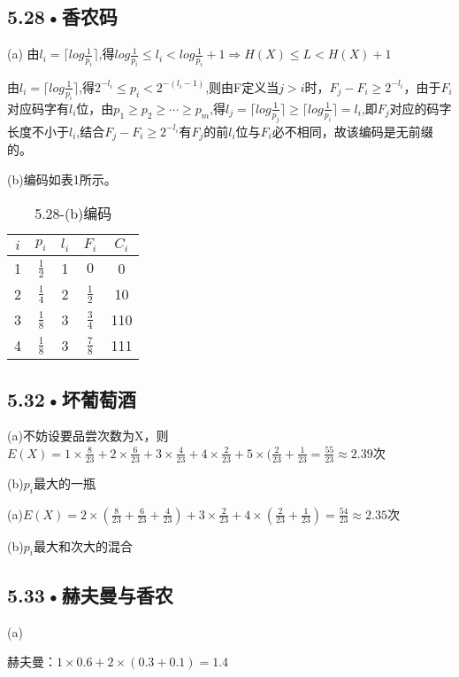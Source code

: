 \documentclass[UTF8]{ctexart}
\begin{document}
\subsection*{5.28•香农码}
(a)
由$l_i=\lceil log\frac{1}{p_i}\rceil$,得$log\frac{1}{p_i}\leqslant l_i< log\frac{1}{p_i}+1\Rightarrow H(X)\leqslant L<H(X)+1$

由$l_i=\lceil log\frac{1}{p_i}\rceil$,得$2^{-l_i}\leqslant p_i<2^{-(l_i-1)}$,则由F定义当$j>i$时，$F_{j}-F_i\geqslant 2^{-l_i}$，由于$F_i$对应码字有$l_i$位，由$p_1\geqslant p_2\geqslant \cdots \geqslant p_m$,得$l_j=\lceil log\frac{1}{p_j}\rceil \geqslant \lceil log\frac{1}{p_i}\rceil= l_i$,即$F_j$对应的码字长度不小于$l_i$,结合$F_j-F_i\geqslant 2^{-l_i}$有$F_j$的前$l_i$位与$F_i$必不相同，故该编码是无前缀的。

(b)编码如表1所示。
\begin{table}[h]
\begin{center}
\caption{5.28-(b)编码}
\begin{tabular}{ccccc}
\hline
$i$ & $p_i$ & $l_i$ & $F_i$ & $C_i$\\
\hline
1 & $\frac{1}{2}$ & 1 &$0$ & 0\\
2 & $\frac{1}{4}$ & 2 &$\frac{1}{2}$ & 10\\
3 & $\frac{1}{8}$ & 3 &$\frac{3}{4}$ & 110\\
4 & $\frac{1}{8}$ & 3 &$\frac{7}{8}$ & 111\\
\hline
\end{tabular}
\end{center}
\end{table}


\subsection*{5.32•坏葡萄酒}
(a)不妨设要品尝次数为X，则
$E(X)=1\times \frac{8}{23}+2\times \frac{6}{23}+3\times\frac{4}{23}+4\times\frac{2}{23}+5\times (\frac{2}{23}+\frac{1}{23}=\frac{55}{23}\approx 2.39$次


(b)$p_i$最大的一瓶

(a)$E(X)=2\times (\frac{8}{23}+\frac{6}{23}+\frac{4}{23})+3\times\frac{2}{23}+4\times (\frac{2}{23}+\frac{1}{23})=\frac{54}{23}\approx 2.35$次

(b)$p_i$最大和次大的混合
\subsection*{5.33•赫夫曼与香农}
(a)

赫夫曼：$1\times 0.6+2\times(0.3+0.1)=1.4$
\end{document}
